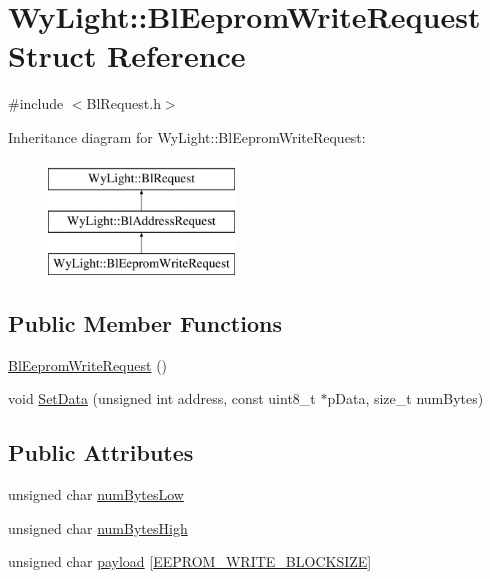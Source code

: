 \hypertarget{struct_wy_light_1_1_bl_eeprom_write_request}{\section{Wy\-Light\-:\-:Bl\-Eeprom\-Write\-Request Struct Reference}
\label{struct_wy_light_1_1_bl_eeprom_write_request}
}


{\ttfamily \#include $<$Bl\-Request.\-h$>$}

Inheritance diagram for Wy\-Light\-:\-:Bl\-Eeprom\-Write\-Request\-:\begin{figure}[H]
\begin{center}
\leavevmode
\includegraphics[height=3.000000cm]{struct_wy_light_1_1_bl_eeprom_write_request}
\end{center}
\end{figure}
\subsection*{Public Member Functions}
\begin{DoxyCompactItemize}
\item 
\hyperlink{struct_wy_light_1_1_bl_eeprom_write_request_aa0b5642cd84432219d60b65f02ba7ae9}{Bl\-Eeprom\-Write\-Request} ()
\item 
void \hyperlink{struct_wy_light_1_1_bl_eeprom_write_request_aefd927d0a951a3922c920eae122577b1}{Set\-Data} (unsigned int address, const uint8\-\_\-t $\ast$p\-Data, size\-\_\-t num\-Bytes)
\end{DoxyCompactItemize}
\subsection*{Public Attributes}
\begin{DoxyCompactItemize}
\item 
unsigned char \hyperlink{struct_wy_light_1_1_bl_eeprom_write_request_a70fa73997362e6e765c9f2bdfaf67aef}{num\-Bytes\-Low}
\item 
unsigned char \hyperlink{struct_wy_light_1_1_bl_eeprom_write_request_a241263672f5229fea259fa45e8cafae0}{num\-Bytes\-High}
\item 
unsigned char \hyperlink{struct_wy_light_1_1_bl_eeprom_write_request_ae5efc27e17509d1ba2655f964f7a2917}{payload} \mbox{[}\hyperlink{_bl_request_8h_a5f45dd63fc17090ece1b40b668195185}{E\-E\-P\-R\-O\-M\-\_\-\-W\-R\-I\-T\-E\-\_\-\-B\-L\-O\-C\-K\-S\-I\-Z\-E}\mbox{]}
\end{DoxyCompactItemize}


